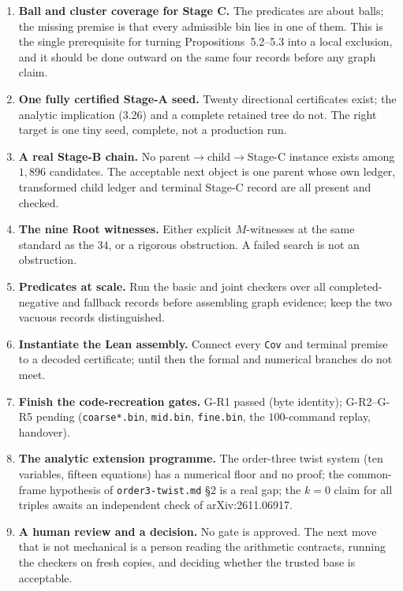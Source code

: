 \documentclass[10pt]{article}
\theoremstyle{definition}
\newcommand{\file}[1]{\texttt{\small #1}}
\begin{document}
\begin{enumerate}[label=\textbf{O\arabic*.},leftmargin=2.2em,itemsep=1pt]
\item \textbf{Ball and cluster coverage for Stage C.} The predicates are about balls; the missing
premise is that every admissible bin lies in one of them. This is the single prerequisite for turning
Propositions~5.2--5.3 into a local exclusion, and it should be done outward on the same four records
before any graph claim.
\item \textbf{One fully certified Stage-A seed.} Twenty directional certificates exist; the analytic
implication (3.26) and a complete retained tree do not. The right target is one tiny seed, complete,
not a production run.
\item \textbf{A real Stage-B chain.} No parent$\to$child$\to$Stage-C instance exists among $1{,}896$
candidates. The acceptable next object is one parent whose own ledger, transformed child ledger and
terminal Stage-C record are all present and checked.
\item \textbf{The nine Root witnesses.} Either explicit $M$-witnesses at the same standard as the
$34$, or a rigorous obstruction. A failed search is not an obstruction.
\item \textbf{Predicates at scale.} Run the basic and joint checkers over all completed-negative and
fallback records before assembling graph evidence; keep the two vacuous records distinguished.
\item \textbf{Instantiate the Lean assembly.} Connect every \texttt{Cov} and terminal premise to a
decoded certificate; until then the formal and numerical branches do not meet.
\item \textbf{Finish the code-recreation gates.} G-R1 passed (byte identity); G-R2--G-R5 pending
(\file{coarse*.bin}, \file{mid.bin}, \file{fine.bin}, the $100$-command replay, handover).
\item \textbf{The analytic extension programme.} The order-three twist system (ten variables, fifteen
equations) has a numerical floor and no proof; the common-frame hypothesis of \file{order3-\allowbreak{}twist.md}
\S2 is a real gap; the $k=0$ claim for all triples awaits an independent check of arXiv:2611.06917.
\item \textbf{A human review and a decision.} No gate is approved. The next move that is not
mechanical is a person reading the arithmetic contracts, running the checkers on fresh copies, and
deciding whether the trusted base is acceptable.
\end{enumerate}
\end{document}
